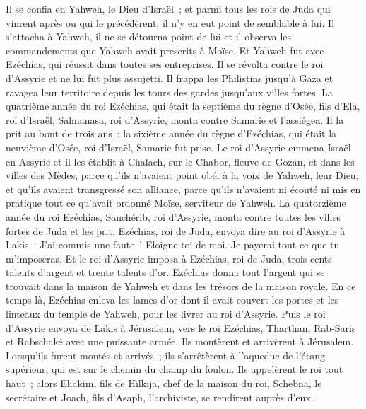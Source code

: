 \begin{multicols}{2}
Il se confia en Yahweh, le Dieu d'Israël~; et parmi tous les rois de Juda qui vinrent après ou qui le précédèrent, il n'y en eut point de semblable à lui.
Il s'attacha à Yahweh, il ne se détourna point de lui et il observa les commandements que Yahweh avait prescrits à Moïse.
Et Yahweh fut avec Ezéchias, qui réussit dans toutes ses entreprises. Il se révolta contre le roi d'Assyrie et ne lui fut plus assujetti.
Il frappa les Philistins jusqu'à Gaza et ravagea leur territoire depuis les tours des gardes jusqu'aux villes fortes.
La quatrième année du roi Ezéchias, qui était la septième du règne d'Osée, fils d'Ela, roi d'Israël, Salmanasa, roi d'Assyrie, monta contre Samarie et l'assiégea.
Il la prit au bout de trois ans~; la sixième année du règne d'Ezéchias, qui était la neuvième d'Osée, roi d'Israël, Samarie fut prise.
Le roi d'Assyrie emmena Israël en Assyrie et il les établit à Chalach, sur le Chabor, fleuve de Gozan, et dans les villes des Mèdes,
parce qu'ils n'avaient point obéi à la voix de Yahweh, leur Dieu, et qu'ils avaient transgressé son alliance, parce qu'ils n'avaient ni écouté ni mis en pratique tout ce qu'avait ordonné Moïse, serviteur de Yahweh.
La quatorzième année du roi Ezéchias, Sanchérib, roi d'Assyrie, monta contre toutes les villes fortes de Juda et les prit.
Ezéchias, roi de Juda, envoya dire au roi d'Assyrie à Lakis~: J'ai commis une faute~! Eloigne-toi de moi. Je payerai tout ce que tu m'imposeras. Et le roi d'Assyrie imposa à Ezéchias, roi de Juda, trois cents talents d'argent et trente talents d'or.
Ezéchias donna tout l'argent qui se trouvait dans la maison de Yahweh et dans les trésors de la maison royale.
En ce temps-là, Ezéchias enleva les lames d'or dont il avait couvert les portes et les linteaux du temple de Yahweh, pour les livrer au roi d'Assyrie.
Puis le roi d'Assyrie envoya de Lakis à Jérusalem, vers le roi Ezéchias, Tharthan, Rab-Saris et Rabschaké avec une puissante armée. Ils montèrent et arrivèrent à Jérusalem. Lorsqu'ils furent montés et arrivés~; ils s'arrêtèrent à l'aqueduc de l'étang supérieur, qui est sur le chemin du champ du foulon.
Ils appelèrent le roi tout haut~; alors Eliakim, fils de Hilkija, chef de la maison du roi, Schebna, le secrétaire et Joach, fils d'Asaph, l'archiviste, se rendirent auprès d'eux.

\end{multicols}
